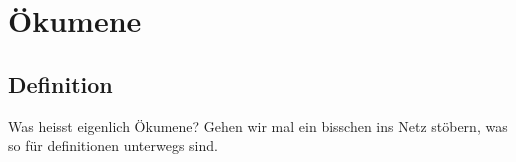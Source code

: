 \section{Ökumene}
\subsection{Definition}

Was heisst eigenlich Ökumene? Gehen wir mal ein bisschen ins Netz stöbern, was so für definitionen unterwegs sind.
